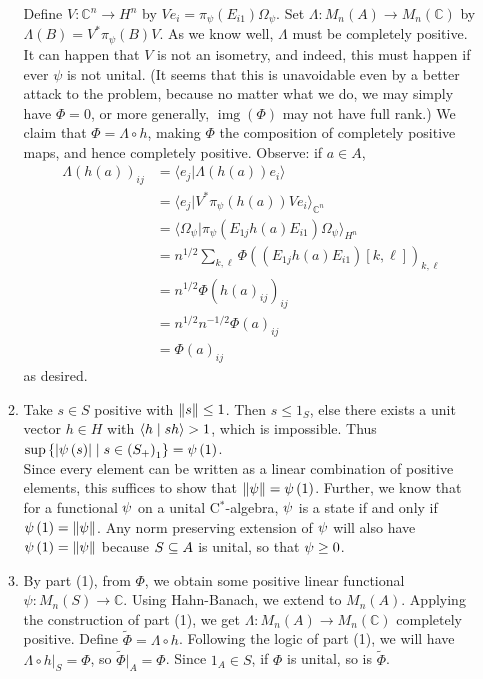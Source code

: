 \documentclass[a4paper,10pt]{report}
\newcommand{\ggen}[1]{\langle#1\rangle}
\newcommand{\C}{\mathbb{C}}
\DeclareMathOperator{\img}{img}
\begin{document}
\begin{enumerate}
\begin{enumerate}
				Define $V:\C^n\to H^n$ by $Ve_i=\pi_\psi(E_{i1})\Omega_\psi$. Set $\Lambda:M_n(A)\to M_n(\C)$ by $\Lambda(B)=V^*\pi_\psi(B)V$. As we know well, $\Lambda$ must be completely positive. It can happen that $V$ is not an isometry, and indeed, this must happen if ever $\psi$ is not unital. 
				(It seems that this is unavoidable even by a better attack to the problem, because no matter what we do, we may simply have $\Phi=0$, or more generally, $\img(\Phi)$ may not have full rank.) 
				We claim that $\Phi=\Lambda\circ h$, making $\Phi$ the composition of completely positive maps, and hence completely positive. Observe: if $a\in A$, 
				\begin{align*}
					\Lambda(h(a))_{ij} &= \ggen{e_j|\Lambda(h(a))e_i}\\
					&= \ggen{e_j|V^*\pi_\psi(h(a))Ve_i}_{\C^n}\\
					&= \ggen{\Omega_\psi|\pi_\psi(E_{1j}h(a)E_{i1})\Omega_\psi}_{H^n}\\
					&= n^{1/2}\sum_{k,\ell}\Phi((E_{1j}h(a)E_{i1})[k,\ell])_{k,\ell}\\
					&= n^{1/2}\Phi(h(a)_{ij})_{ij}\\
					&= n^{1/2}n^{-1/2}\Phi(a)_{ij}\\
					&= \Phi(a)_{ij}
				\end{align*}
				as desired. 
			      \item Take $s \in S$ positive with $\left\| s \right\| \leq 1$.  Then $s \leq 1_S$, else there exists a unit vector $h \in H$ with $\left\langle h \mid s h \right\rangle > 1$, which is impossible.
                                Thus $\sup \left\{ \left| \psi \left( s \right) \right| \mid s \in \left( S_+ \right)_1 \right\} = \psi \left( 1 \right)$.\\
                                Since every element can be written as a linear combination of positive elements, this suffices to show that $\left\| \psi \right\| = \psi \left( 1 \right)$.
                                Further, we know that for a functional $\psi$ on a unital C$^*$-algebra, $\psi$ is a state if and only if $\psi \left( 1 \right) = \left\| \psi \right\|$.
                                Any norm preserving extension of $\psi$ will also have $\psi \left( 1 \right) = \left\| \psi \right\|$ because $S \subseteq A$ is unital, so that $\psi \geq 0$.
			\item By part (1), from $\Phi$, we obtain some positive linear functional $\psi:M_n(S)\to\C$. Using Hahn-Banach, we extend to $M_n(A)$. Applying the construction of part (1), we get $\Lambda:M_n(A)\to M_n(\C)$ completely positive. Define $\widetilde{\Phi}=\Lambda\circ h$. Following the logic of part (1), we will have $\Lambda\circ h|_S=\Phi$, so $\widetilde{\Phi}|_A=\Phi$. Since $1_A\in S$, if $\Phi$ is unital, so is $\widetilde{\Phi}$. 

\end{enumerate}
\end{enumerate}
\end{document}
